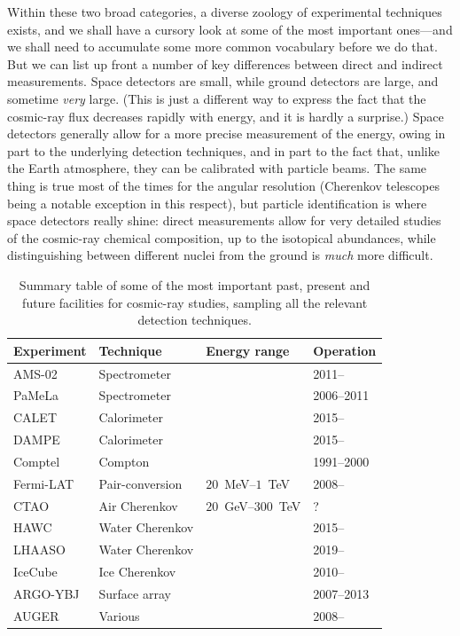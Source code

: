 Within these two broad categories, a diverse zoology of experimental techniques exists,
and we shall have a cursory look at some of the most important ones---and we shall
need to accumulate some more common vocabulary before we do that. But we can list
up front a number of key differences between direct and indirect measurements.
Space detectors are small, while ground detectors are large, and sometime \emph{very}
large. (This is just a different way to express the fact that the cosmic-ray flux
decreases rapidly with energy, and it is hardly a surprise.) Space detectors generally
allow for a more precise measurement of the energy, owing in part to the underlying detection
techniques, and in part to the fact that, unlike the Earth atmosphere, they can be
calibrated with particle beams. The same thing is true most of the times for the
angular resolution (Cherenkov telescopes being a notable exception in this respect),
but particle identification is where space detectors really shine: direct measurements
allow for very detailed studies of the cosmic-ray chemical composition, up to the
isotopical abundances, while distinguishing between different nuclei from the
ground is \emph{much} more difficult.

\begin{table}[htbp!]
  \caption{Summary table of some of the most important past, present and future
  facilities for cosmic-ray studies, sampling all the relevant detection techniques.}
  \label{tab:cr_experiments}
  \begin{tabular}{llll}
    \hline
    Experiment & Technique & Energy range & Operation\\
    \hline
    \hline
    AMS-02 & Spectrometer & & 2011--\\
    PaMeLa & Spectrometer & & 2006--2011\\
    CALET & Calorimeter & & 2015--\\
    DAMPE~\cite{2017APh....95....6C} & Calorimeter &  & 2015--\\
    Comptel & Compton & & 1991--2000\\
    Fermi-LAT~\cite{2009ApJ...697.1071A} & Pair-conversion & $20$~MeV--$1$~TeV & 2008--\\
    CTAO & Air Cherenkov & $20$~GeV--$300$~TeV & ? \\
    HAWC & Water Cherenkov & & 2015--\\
    LHAASO & Water Cherenkov & & 2019--\\
    IceCube & Ice Cherenkov &  & 2010--\\
    ARGO-YBJ & Surface array &  & 2007--2013\\
    AUGER & Various & & 2008--\\
    \hline
  \end{tabular}
\end{table}

